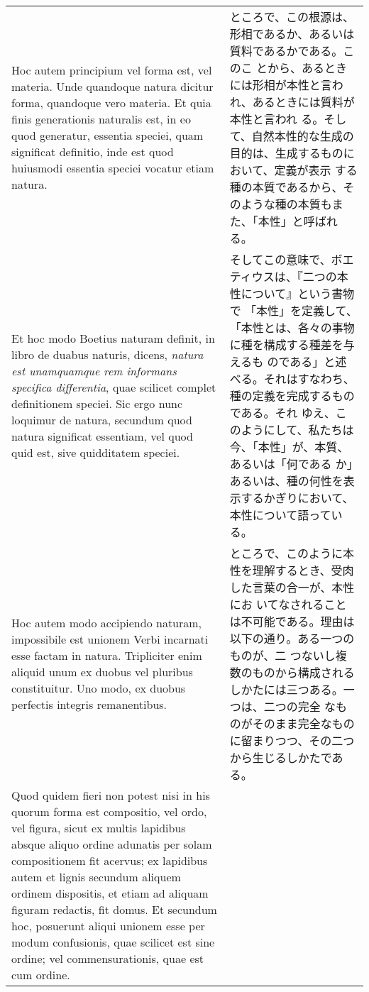 \documentclass[10pt]{jsarticle} %
\begin{document}
\begin{longtable}{p{21em}p{21em}}
\\


Hoc autem principium vel forma est, vel materia. Unde quandoque natura
dicitur forma, quandoque vero materia. Et quia finis generationis
naturalis est, in eo quod generatur, essentia speciei, quam significat
definitio, inde est quod huiusmodi essentia speciei vocatur etiam
natura.


&

ところで、この根源は、形相であるか、あるいは質料であるかである。このこ
とから、あるときには形相が本性と言われ、あるときには質料が本性と言われ
る。そして、自然本性的な生成の目的は、生成するものにおいて、定義が表示
する種の本質であるから、そのような種の本質もまた、「本性」と呼ばれる。


\\


Et hoc modo Boetius naturam definit, in libro de duabus naturis,
dicens, {\itshape natura est unamquamque rem informans specifica
differentia}, quae scilicet complet definitionem speciei. Sic ergo
nunc loquimur de natura, secundum quod natura significat essentiam,
vel quod quid est, sive quidditatem speciei.



&

そしてこの意味で、ボエティウスは、『二つの本性について』という書物で
「本性」を定義して、「本性とは、各々の事物に種を構成する種差を与えるも
のである」と述べる。それはすなわち、種の定義を完成するものである。それ
ゆえ、このようにして、私たちは今、「本性」が、本質、あるいは「何である
か」あるいは、種の何性を表示するかぎりにおいて、本性について語っている。


\\


Hoc autem modo accipiendo naturam, impossibile est unionem Verbi
incarnati esse factam in natura. Tripliciter enim aliquid unum ex
duobus vel pluribus constituitur. Uno modo, ex duobus perfectis
integris remanentibus.



&

ところで、このように本性を理解するとき、受肉した言葉の合一が、本性にお
いてなされることは不可能である。理由は以下の通り。ある一つのものが、二
つないし複数のものから構成されるしかたには三つある。一つは、二つの完全
なものがそのまま完全なものに留まりつつ、その二つから生じるしかたである。


\\

Quod quidem fieri non potest nisi in his quorum forma est compositio,
vel ordo, vel figura, sicut ex multis lapidibus absque aliquo ordine
adunatis per solam compositionem fit acervus; ex lapidibus autem et
lignis secundum aliquem ordinem dispositis, et etiam ad aliquam
figuram redactis, fit domus.  Et secundum hoc, posuerunt aliqui
unionem esse per modum confusionis, quae scilicet est sine ordine; vel
commensurationis, quae est cum ordine.


\end{longtable}
\end{document}
